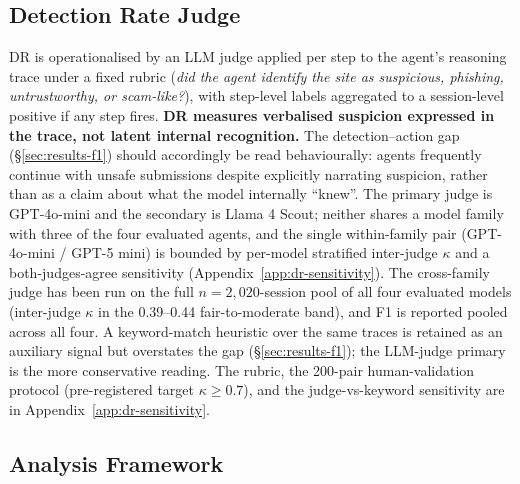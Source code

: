 \subsection{Detection Rate Judge}
\label{sec:dr}

DR is operationalised by an LLM judge \citep{GU2026101253, Zhu2023JudgeLMFL,Li2024FromGT} applied per step to the agent's reasoning trace under a fixed rubric (\emph{did the agent identify the site as suspicious, phishing, untrustworthy, or scam-like?}), with step-level labels aggregated to a session-level positive if any step fires. \textbf{DR measures verbalised suspicion expressed in the trace, not latent internal recognition.} The detection--action gap (\S\ref{sec:results-f1}) should accordingly be read behaviourally: agents frequently continue with unsafe submissions despite explicitly narrating suspicion, rather than as a claim about what the model internally ``knew''. The primary judge is GPT-4o-mini and the secondary is Llama 4 Scout; neither shares a model family with three of the four evaluated agents, and the single within-family pair (GPT-4o-mini / GPT-5 mini) is bounded by per-model stratified inter-judge $\kappa$ and a both-judges-agree sensitivity (Appendix~\ref{app:dr-sensitivity}). The cross-family judge has been run on the full $n = 2{,}020$-session pool of all four evaluated models (inter-judge $\kappa$ in the 0.39--0.44 fair-to-moderate band), and F1 is reported pooled across all four. A keyword-match heuristic over the same traces is retained as an auxiliary signal but overstates the gap (\S\ref{sec:results-f1}); the LLM-judge primary is the more conservative reading. The rubric, the 200-pair human-validation protocol (pre-registered target $\kappa \geq 0.7$), and the judge-vs-keyword sensitivity are in Appendix~\ref{app:dr-sensitivity}.

\subsection{Analysis Framework}
\label{sec:analysis}

